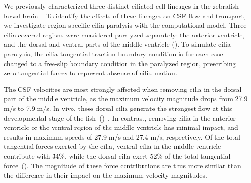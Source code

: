\documentclass{WileyMSP-template}
\begin{document}
We previously characterized three distinct ciliated cell lineages in the
zebrafish larval brain~\cite{Olstad2019CiliaryDevelopment, DGama2025MotileBrain}.
To identify the effects of these lineages on CSF flow and transport, 
we investigate region-specific cilia paralysis with the computational model.
Three cilia-covered regions were considered paralyzed separately:
the anterior ventricle, and the dorsal and ventral parts
of the middle ventricle ().
To simulate cilia paralysis, the cilia tangential traction boundary condition
is for each case changed to a free-slip boundary condition
in the paralyzed region,
prescribing zero tangential forces to
represent absence of cilia motion.

The CSF velocities are most strongly
affected when removing cilia in the dorsal part of the middle ventricle,
as the maximum velocity magnitude drops from 27.9 \textmu m/s to 7.9 \textmu m/s.
In vivo, these dorsal cilia generate the strongest flow at
this developmental stage of the fish~()~\cite{Olstad2019CiliaryDevelopment}.
In contrast, removing cilia in the anterior ventricle or the ventral region of the middle
ventricle has minimal impact, and results in maximum speeds
of 27.9 \textmu m/s and 27.4 \textmu m/s, respectively.
Of the total tangential forces exerted by the cilia, ventral cilia in the middle ventricle
contribute with 34\%, while the dorsal cilia exert 52\% of the total tangential
force~(). The magnitude of these force contributions are thus
more similar than the difference in their impact on the maximum velocity magnitudes.
\end{document}
